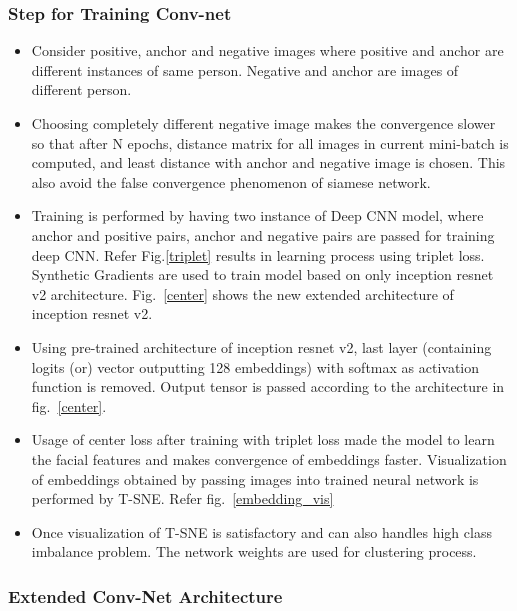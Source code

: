 \documentclass[a4paper,12pt, twoside]{NITKReport}
\begin{document}
\subsubsection{Step for Training Conv-net}
\begin{itemize}

\item Consider positive, anchor and negative images where positive and anchor are different instances of same person. Negative and anchor are images of different person.
\item Choosing completely different negative image makes the convergence slower so that after N epochs, distance matrix for all images in current mini-batch is computed, and least distance with anchor and negative image is chosen. This also avoid the false convergence phenomenon of siamese network. 
\item Training is performed by having two instance of Deep CNN model, where anchor and positive pairs, anchor and negative pairs are passed for training deep CNN. Refer Fig.\ref{triplet} results in learning process using triplet loss. Synthetic Gradients are used to train model based on only inception resnet v2 architecture. Fig.~\ref{center} shows the new extended architecture of inception resnet v2.

\item Using pre-trained architecture of inception resnet v2, last layer (containing logits (or) vector outputting 128 embeddings) with softmax as activation function is removed. Output tensor is passed according to the architecture in fig.~\ref{center}. 

\item Usage of center loss after training with triplet loss made the model to learn the facial features and makes convergence of embeddings faster. Visualization of embeddings obtained by passing images into trained neural network is performed by T-SNE. Refer fig.~\ref{embedding_vis}

\item Once visualization of T-SNE is satisfactory and can also handles high class imbalance problem. The network weights are used for clustering process.

\end{itemize}

\subsubsection{Extended Conv-Net Architecture}
\end{document}
